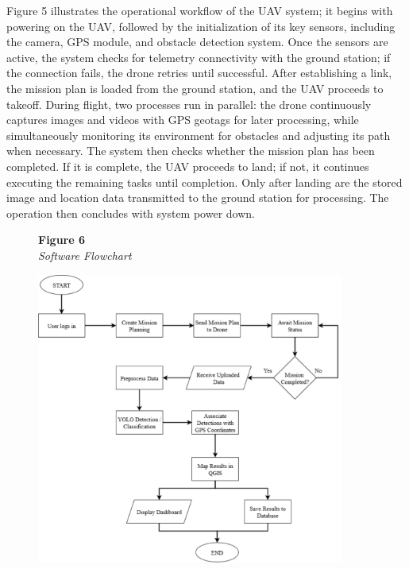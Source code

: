 	Figure 5 illustrates the operational workflow of the UAV system; it begins with powering on the UAV, followed by the initialization of its key sensors, including the camera, GPS module, and obstacle detection system. Once the sensors are active, the system checks for telemetry connectivity with the ground station; if the connection fails, the drone retries until successful. After establishing a link, the mission plan is loaded from the ground station, and the UAV proceeds to takeoff. During flight, two processes run in parallel: the drone continuously captures images and videos with GPS geotags for later processing, while simultaneously monitoring its environment for obstacles and adjusting its path when necessary. The system then checks whether the mission plan has been completed. If it is complete, the UAV proceeds to land; if not, it continues executing the remaining tasks until completion. Only after landing are the stored image and location data transmitted to the ground station for processing. The operation then concludes with system power down.
	
	\begin{figure}[H]
		\raggedright
		\textbf{Figure 6} \\ %
		\textit{Software Flowchart} %
		
		\vspace{0.5em}
		\centering
		\includegraphics[width=0.9\textwidth]{figures/Soft_Flow.pdf} %
		
		\vspace{0.5em}
		\raggedright
		
		\label{fig:SoftFlow}
	\end{figure}
	
